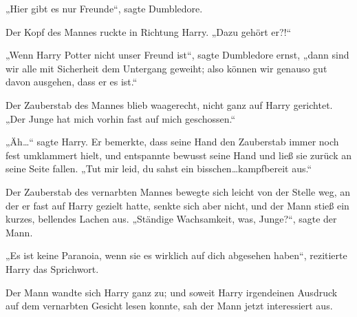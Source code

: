 „Hier gibt es nur Freunde“, sagte Dumbledore.

Der Kopf des Mannes ruckte in Richtung Harry. „Dazu gehört er?!“

„Wenn Harry Potter nicht unser Freund ist“, sagte Dumbledore ernst, „dann sind wir alle mit Sicherheit dem Untergang geweiht; also können wir genauso gut davon ausgehen, dass er es ist.“

Der Zauberstab des Mannes blieb waagerecht, nicht ganz auf Harry gerichtet. „Der Junge hat mich vorhin fast auf mich geschossen.“

„Äh…“ sagte Harry. Er bemerkte, dass seine Hand den Zauberstab immer noch fest umklammert hielt, und entspannte bewusst seine Hand und ließ sie zurück an seine Seite fallen. „Tut mir leid, du sahst ein bisschen…kampfbereit aus.“

Der Zauberstab des vernarbten Mannes bewegte sich leicht von der Stelle weg, an der er fast auf Harry gezielt hatte, senkte sich aber nicht, und der Mann stieß ein kurzes, bellendes Lachen aus. „Ständige Wachsamkeit, was, Junge?“, sagte der Mann.

„Es ist keine Paranoia, wenn sie es wirklich auf dich abgesehen haben“, rezitierte Harry das Sprichwort.

Der Mann wandte sich Harry ganz zu; und soweit Harry irgendeinen Ausdruck auf dem vernarbten Gesicht lesen konnte, sah der Mann jetzt interessiert aus.

